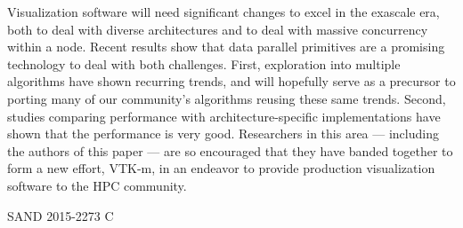 \documentclass{superfri}
\begin{document}
\noindent
Visualization software will need significant changes to excel in
the exascale era, both to deal with diverse architectures and to 
deal with massive concurrency within a node.
%
Recent results show that data parallel primitives are a promising technology
to deal with both challenges.
%
First, exploration into multiple algorithms have shown recurring
trends, and will hopefully serve as a precursor to porting many of our
community's algorithms reusing these same trends.
%
Second, studies comparing performance with architecture-specific
implementations have shown that the performance is very good.
%
Researchers in this area --- including the authors of this paper ---
are so encouraged that they have banded together to form a new effort, 
VTK-m, in an endeavor to provide production visualization software
to the HPC community.


{\scriptsize SAND 2015-2273 C}




\end{document}
